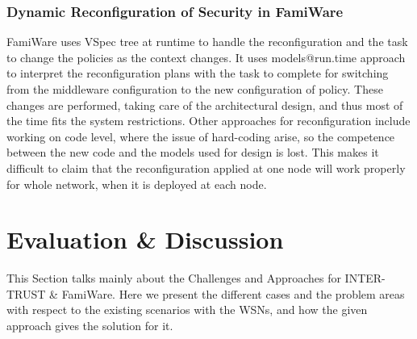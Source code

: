 \documentclass[12pt,a4paper,twoside]{report}
\begin{document}
\subsubsection{Dynamic Reconfiguration of Security in FamiWare}
FamiWare uses VSpec tree at runtime to handle the reconfiguration and the task to change the policies as the context changes. It uses models@run.time \cite{blair;bencomo:2009} approach to interpret the reconfiguration plans with the task to complete for switching from the middleware configuration to the new configuration of policy. These changes are performed, taking care of the architectural design, and thus most of the time fits the system restrictions. Other approaches for reconfiguration include working on code level, where the issue of hard-coding arise, so the competence between the new code and the models used for design is lost. This makes it difficult to claim that the reconfiguration applied at one node will work properly for whole network, when it is deployed at each node.\par

\section{Evaluation \& Discussion}
This Section talks mainly about the Challenges and Approaches for INTER-TRUST \& FamiWare. Here we present the different cases and the problem areas with respect to the existing scenarios with the WSNs, and how the given approach gives the solution for it.
\end{document}
